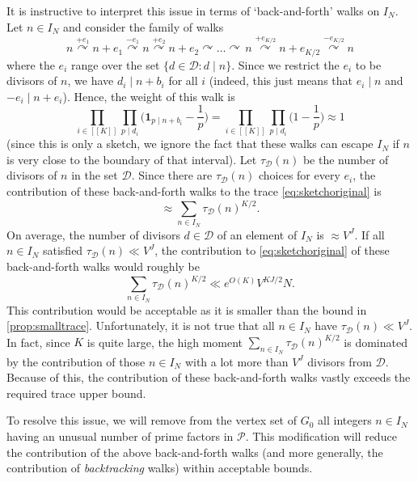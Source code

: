 \documentclass[11pt]{amsart}
\theoremstyle{definition}
\newcommand{\sinterval}[1]{[\![#1]\!] }
\newcommand{\ind}[1]{\mathbf{1}_{#1}}
\newcommand{\N}{I_N}
\newcommand{\primes}{\mathcal{P}}
\newcommand{\D}{\mathcal{D}}
\newcommand{\curlyLpower}{V^{\repR}}
\newcommand{\curlyLexp}[1]{V^{#1}}
\newcommand{\graph}{G}
\newcommand{\sommespart}{b}
\newcommand{\repR}{J}
\newcommand{\repK}{K}
\newcommand{\newK}{\sinterval{K}}
\begin{document}
It is instructive to interpret this issue in terms of `back-and-forth' walks on $\N$. Let $n\in \N$ and consider the family of walks
\begin{equation*}
n \stackrel{+e_1}{\curvearrowright} n+e_1 \stackrel{-e_1}{\curvearrowright} n \stackrel{+e_2}{\curvearrowright} n+e_2 \curvearrowright \ldots {\curvearrowright}\,  n \stackrel{+e_{\repK/2}}{\curvearrowright} n+e_{\repK/2}\stackrel{-e_{\repK/2}}{\curvearrowright} n
\end{equation*}
where the $e_i$ range over the set $\{d\in \D : d\mid n\}$. Since we restrict the $e_i$ to be divisors of $n$, we have $d_i \mid n+\sommespart_i$ for all $i$ (indeed, this just means that $e_i \mid n$ and $-e_i\mid n+e_i$). Hence, the weight of this walk is
\begin{equation*}
	\prod_{i\in \newK}  \prod_{p\mid d_i} \bigg(\ind{p\mid n+\sommespart_i} - \frac{1}{p} \bigg) = \prod_{i\in \newK}  \prod_{p\mid d_i} \bigg(1 - \frac{1}{p} \bigg) \approx 1
\end{equation*}
(since this is only a sketch, we ignore the fact that these walks can escape $\N$ if $n$ is very close to the boundary of that interval). Let $\tau_{\D}(n)$ be the number of divisors of $n$ in the set $\D$. Since there are $\tau_{\D}(n)$ choices for every $e_i$, the contribution of these back-and-forth walks to the trace \cref{eq:sketchoriginal} is 
\begin{equation*}
	\approx \sum_{n\in \N} \tau_{\D}(n)^{\repK/2}.
\end{equation*}
On average, the number of divisors $d\in \D$ of an element of $\N$ is $\approx \curlyLpower$. If all $n\in \N$ satisfied $ \tau_{\D}(n) \ll \curlyLpower$, the contribution to \cref{eq:sketchoriginal} of these back-and-forth walks would roughly be 
\begin{equation*}
	\sum_{n\in \N}  \tau_{\D}(n)^{\repK/2} \ll e^{O(\repK)} \curlyLexp{\repK\repR/2} N.
\end{equation*}
This contribution would be acceptable as it is smaller than the bound in \cref{prop:smalltrace}. Unfortunately, it is not true that all $n\in \N$ have $ \tau_{\D}(n) \ll \curlyLpower$. In fact, since $\repK$ is quite large, the high moment $\sum_{n\in \N}  \tau_{\D}(n)^{\repK/2}$ is dominated by the contribution of those $n\in \N$ with a lot more than $\curlyLpower$ divisors from $\D$. Because of this, the contribution of these back-and-forth walks vastly exceeds the required trace upper bound.

To resolve this issue, we will remove from the vertex set of $\graph_0$ all integers $n\in \N$ having an unusual number of prime factors in $\primes$. This modification will reduce the contribution of the above back-and-forth walks (and more generally, the contribution of \emph{backtracking} walks) within acceptable bounds.
\end{document}
